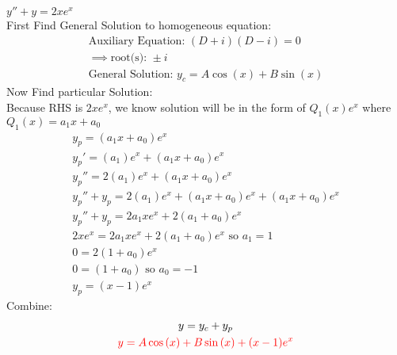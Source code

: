 \item [23.] $y''+y=2xe^x$\\[2mm]
First Find General Solution to homogeneous equation:
\begin{gather*}
    \text{Auxiliary Equation: } (D+i)(D-i)=0\\
    \implies \text{root(s): } \pm i\\
    \text{General Solution: } y_c=A\cos{(x)}+B\sin{(x)}
\end{gather*}
Now Find particular Solution:\\
Because RHS is $2xe^x$, we know solution will be in the form of $Q_1(x)e^x$ where $Q_1(x) = a_1x+a_0$
\begin{gather*}
    y_p = (a_1x+a_0)e^x\\
    y_p' = (a_1)e^x+(a_1x+a_0)e^x\\
    y_p'' = 2(a_1)e^x+(a_1x+a_0)e^x\\
    y_p''+y_p=2(a_1)e^x+(a_1x+a_0)e^x+(a_1x+a_0)e^x\\
    y_p''+y_p=2a_1xe^x+2(a_1+a_0)e^x\\
    2xe^x=2a_1xe^x+2(a_1+a_0)e^x \text{ so }a_1 = 1\\
    0=2(1+a_0)e^x\\
    0=(1+a_0) \text{ so }a_0 = -1\\
    y_p = (x-1)e^x
\end{gather*}
Combine:
\begin{gather*}
    y=y_c+y_p\\
    \textcolor{red}{y = A\cos{(x)}+B\sin{(x)}+(x-1)e^x}
\end{gather*}